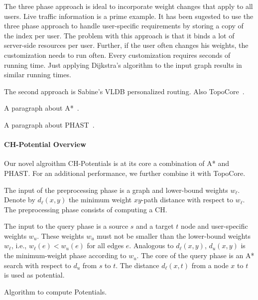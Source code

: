 \documentclass[a4paper,UKenglish,cleveref, autoref]{lipics-v2019}
\begin{document}
The three phase approach is ideal to incorporate weight changes that apply to all users.
Live traffic information is a prime example.
It has been sugested to use the three phase approach to handle user-specific requirements by storing a copy of the index per user.
The problem with this approach is that it binds a lot of server-side resources per user.
Further, if the user often changes his weights, the customization needs to run often.
Every customization requires seconds of running time.
Just applying Dijkstra's algorithm to the input graph results in similar running times.

The second approach is Sabine's VLDB personalized routing.
Also TopoCore~\cite{?}.

A paragraph about A*~\cite{?}.

A paragraph about PHAST~\cite{?}.

\paragraph{CH-Potential Overview}

Our novel algroithm CH-Potentials is at its core a combination of A* and PHAST.
For an additional performance, we further combine it with TopoCore.

The input of the preprocessing phase is a graph and lower-bound weights $w_{\ell}$.
Denote by $d_{\ell}(x,y)$ the minimum weight $xy$-path distance with respect to $w_{\ell}$.
The preprocessing phase consists of computing a CH.

The input to the query phase is a source $s$ and a target $t$ node and user-specific weights $w_u$.
These weights $w_u$ must not be smaller than the lower-bound weights $w_{\ell}$, i.e., $w_{\ell}(e) < w_u(e)$ for all edges $e$.
Analogous to $d_{\ell}(x,y)$, $d_u(x,y)$ is the minimum-weight phase according to $w_u$.
The core of the query phase is an A* search with respect to $d_u$ from $s$ to $t$.
The distance $d_{\ell}(x,t)$ from a node $x$ to $t$ is used as potential.

\begin{algorithm2e}

\caption{Algorithm to compute Potentials.}
\label{algo:pot}

\end{algorithm2e}
\end{document}
